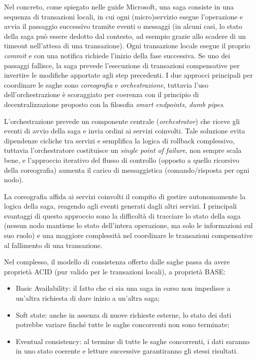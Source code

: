 Nel concreto, come spiegato nelle guide Microsoft\cite{Microsoft_Saga_Pattern}, una saga consiste in una sequenza di transazioni locali, in cui ogni (micro)servizio esegue l’operazione e avvia il passaggio successivo tramite eventi o messaggi (in alcuni casi, lo stato della saga può essere dedotto dal contesto, ad esempio grazie allo scadere di un timeout nell'attesa di una transazione). Ogni transazione locale esegue il proprio \emph{commit} e con una notifica richiede l'inizio della fase successiva. Se uno dei passaggi fallisce, la saga prevede l'esecuzione di transazioni compensative per invertire le modifiche apportate agli step precedenti.
I due approcci principali per coordinare le saghe sono \emph{coreografia} e \emph{orchestrazione}, tuttavia l'uso dell'orchestrazione è scoraggiato per coerenza con il principio di decentralizzazione proposto con la filosofia \emph{smart endpoints, dumb pipes}.

L'orchestrazione prevede un componente centrale (\emph{orchestrator}) che riceve gli eventi di avvio della saga e invia ordini ai servizi coinvolti. Tale soluzione evita dipendenze cicliche tra servizi e semplifica la logica di rollback complessivo, tuttavia l'orchestratore costituisce un \emph{single point of failure}, non sempre scala bene, e l'approccio iterativo del flusso di controllo (opposto a quello ricorsivo della coreografia) aumenta il carico di messaggistica (comando/risposta per ogni nodo).

La coreografia affida ai servizi coinvolti il compito di gestire autonomamente la logica della saga, reagendo agli eventi generati dagli altri servizi. I principali svantaggi di questo approccio sono la difficoltà di tracciare lo stato della saga (nessun nodo mantiene lo stato dell'intera operazione, ma solo le informazioni sul suo ruolo) e una maggiore complessità nel coordinare le transazioni compensative al fallimento di una transazione.

Nel complesso, il modello di consistenza offerto dalle saghe passa da avere proprietà ACID (pur valido per le transazioni locali), a proprietà BASE:
\begin{itemize}
  \item Basic Availability: il fatto che ci sia una saga in corso non impedisce a un'altra richiesta di dare inizio a un'altra saga;
  \item Soft state: anche in assenza di nuove richieste esterne, lo stato dei dati potrebbe variare finché tutte le saghe concorrenti non sono terminate;
  \item Eventual consistency: al termine di tutte le saghe concorrenti, i dati saranno in uno stato coerente e letture successive garantiranno gli stessi risultati.
\end{itemize}

